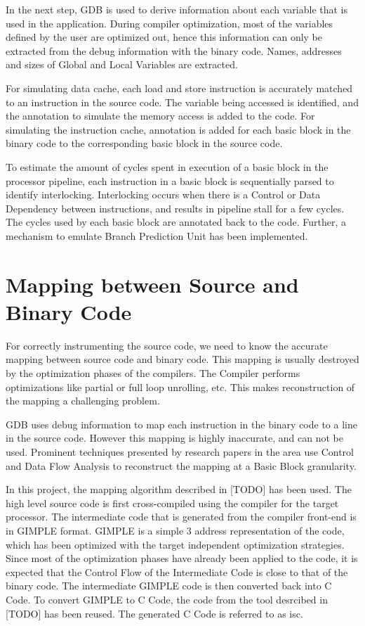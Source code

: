 In the next step, GDB is used to derive information about each variable that is used in the application. During compiler optimization, most of the variables defined by the user are optimized out, hence this information can only be extracted from the debug information with the binary code. Names, addresses and sizes of Global and Local Variables are extracted.

For simulating data cache, each load and store instruction is accurately matched to an instruction in the source code. The variable being accessed is identified, and the annotation to simulate the memory access is added to the code. For simulating the instruction cache, annotation is added for each basic block in the binary code to the corresponding basic block in the source code.

To estimate the amount of cycles spent in execution of a basic block in the processor pipeline, each instruction in a basic block is sequentially parsed to identify interlocking. Interlocking occurs when there is a Control or Data Dependency between instructions, and results in pipeline stall for a few cycles. The cycles used by each basic block are annotated back to the code. Further, a mechanism to emulate Branch Prediction Unit has been implemented. 

\section{Mapping between Source and Binary Code}
For correctly instrumenting the source code, we need to know the accurate mapping between source code and binary code. This mapping is usually destroyed by the optimization phases of the compilers. The Compiler performs optimizations like partial or full loop unrolling, etc. %
This makes reconstruction of the mapping a challenging problem.

GDB uses debug information to map each instruction in the binary code to a line in the source code. However this mapping is highly inaccurate, and can not be used. Prominent techniques presented by research papers in the area use Control and Data Flow Analysis to reconstruct the mapping at a Basic Block granularity. 

In this project, the mapping algorithm described in [TODO] has been used. The high level source code is first cross-compiled using the compiler for the target processor. The intermediate code that is generated from the compiler front-end is in GIMPLE format. GIMPLE is a simple 3 address representation of the code, which has been optimized with the target independent optimization strategies. Since most of the optimization phases have already been applied to the code, it is expected that the Control Flow of the Intermediate Code is close to that of the binary code. The intermediate GIMPLE code is then converted back into C Code. To convert GIMPLE to C Code, the code from the tool desrcibed in [TODO] has been reused. The generated C Code is referred to as \gls{isc}.

